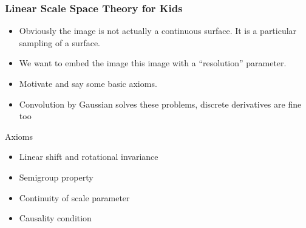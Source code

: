 \documentclass[9pt,notes]{beamer}
\begin{document}
\begin{frame}
\frametitle[Scale Space Theory]{Linear Scale Space Theory for Kids}
\begin{itemize}
  \item Obviously the image is not actually a continuous surface.
        It is a particular sampling of a surface. 
  \item We want to embed the image this image with a ``resolution'' parameter.
  \item Motivate and say some basic axioms.
  \item Convolution by Gaussian solves these problems, discrete derivatives are fine too
\end{itemize}

\begin{block}{Axioms}
  \begin{itemize}
    \item Linear shift and rotational invariance
    \item Semigroup property
    \item Continuity of scale parameter
    \item Causality condition
    \end{itemize}
  \end{block}
\end{frame}
\end{document}
